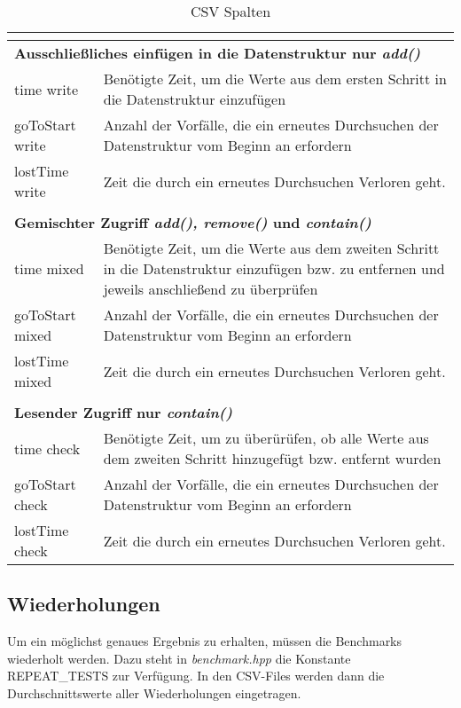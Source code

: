 \begin{table}[hbt!]
\begin{tabular}{ |m{2.5cm}|  m{13cm}| }
	 \multicolumn{2}{l}{} \\ \hline
	 \multicolumn{2}{|l|}{\textbf{Ausschließliches einfügen in die Datenstruktur nur \textit{add()}}}    \\ \hline
	 time write& 	Benötigte Zeit, um die Werte aus dem ersten Schritt in die Datenstruktur einzufügen\\ \hline
	 goToStart write& Anzahl der Vorfälle, die ein erneutes Durchsuchen der Datenstruktur vom Beginn an erfordern\\ \hline
	 lostTime write&  Zeit die durch ein erneutes Durchsuchen Verloren geht.\\ \hline
	 \multicolumn{2}{l}{} \\ \hline
	 \multicolumn{2}{|l|}{\textbf{Gemischter Zugriff \textit{add(), remove()} und \textit{contain()}}}    \\ \hline
	 time mixed& 	Benötigte Zeit, um die Werte aus dem zweiten Schritt in die Datenstruktur einzufügen 
	 				bzw. zu entfernen und jeweils anschließend zu überprüfen\\ \hline
	 goToStart mixed& Anzahl der Vorfälle, die ein erneutes Durchsuchen der Datenstruktur vom Beginn an erfordern\\ \hline
	 lostTime mixed& Zeit die durch ein erneutes Durchsuchen Verloren geht.\\ \hline
	 \multicolumn{2}{l}{} \\ \hline
	 \multicolumn{2}{|l|}{\textbf{Lesender Zugriff nur \textit{contain()}}}    \\ \hline
	 time check& Benötigte Zeit, um zu überürüfen, ob alle Werte aus dem zweiten Schritt hinzugefügt bzw. entfernt wurden \\ \hline
	 goToStart check& Anzahl der Vorfälle, die ein erneutes Durchsuchen der Datenstruktur vom Beginn an erfordern\\ \hline
	 lostTime check& Zeit die durch ein erneutes Durchsuchen Verloren geht.\\ \hline
	\end{tabular} 
	\caption{CSV Spalten}
	\label{tab:csv}
	\end{table}

\subsection{Wiederholungen}
Um ein möglichst genaues Ergebnis zu erhalten, müssen die Benchmarks wiederholt werden. Dazu steht in \textit{benchmark.hpp}
die Konstante REPEAT\_TESTS zur Verfügung. In den CSV-Files werden dann die Durchschnittswerte aller Wiederholungen eingetragen.